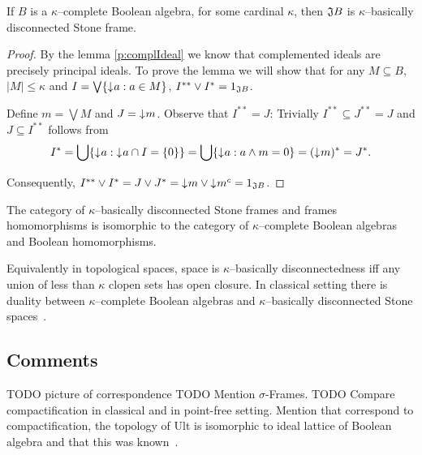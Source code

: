 \begin{lemma}
    If $B$ is a $\kappa$--complete Boolean algebra, for some cardinal $\kappa$, then $\mathfrak{J} B$ is $\kappa$--basically disconnected Stone frame.
\end{lemma}
\begin{proof}
    By the lemma \ref{p:complIdeal} we know that complemented ideals are precisely principal ideals. To prove the lemma we will show that for any $M \subseteq B$, $|M| \leq \kappa$ and $I = \bigvee \{ \mathord{\downarrow}\mkern1mu a : a \in M \}$, $I^{**} \vee I^* = 1_{\mathfrak{J} B}$.

    Define $m = \bigvee M$ and $J = \mathord{\downarrow}\mkern1mu m$. Observe that $I^{**} = J$: Trivially $I^{**} \subseteq J^{**} = J$ and $J \subseteq I^{**}$ follows from
    $$ I^* = \bigcup \{ \mathord{\downarrow}\mkern1mu a : \mathord{\downarrow}\mkern1mu a \cap I = \{0\} \} = \bigcup \{ \mathord{\downarrow}\mkern1mu a : a \wedge m = 0 \} = (\mathord{\downarrow}\mkern1mu m)^* = J^*.$$

    Consequently, $I^{**} \vee I^* = J \vee J^* = \mathord{\downarrow}\mkern1mu m \vee \mathord{\downarrow}\mkern1mu m^c = 1_{\mathfrak{J} B}$.
\end{proof}

\begin{theorem}
    The category of $\kappa$--basically disconnected Stone frames and frames homomorphisms is isomorphic to the category of $\kappa$--complete Boolean algebras and Boolean homomorphisms.
\end{theorem}

Equivalently in topological spaces, space is $\kappa$--basically disconnectedness iff any union of less than $\kappa$ clopen sets has open closure. In classical setting there is duality between $\kappa$--complete Boolean algebras and $\kappa$--basically disconnected Stone spaces~\cite{monk1989handbook}.

\subsection*{Comments}
TODO picture of correspondence
TODO Mention $\sigma$-Frames.
TODO Compare compactification in classical and in point-free setting. Mention that \J{} correspond to compactification, the topology of Ult is isomorphic to ideal lattice of Boolean algebra and that this was known~\cite{monk1989handbook}.
